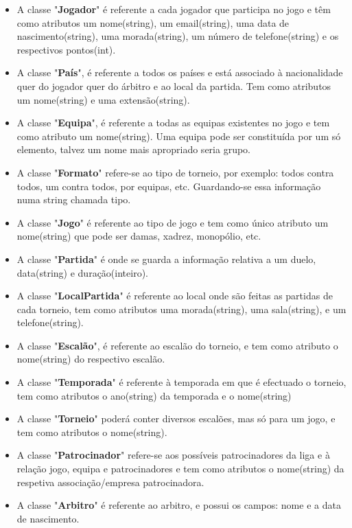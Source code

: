 \documentclass[a4paper]{article}
\begin{document}
\begin{itemize}

\item A classe "\textbf{Jogador}" é referente a cada jogador que participa no jogo e têm como atributos um nome(string), um email(string), uma data de nascimento(string), uma morada(string), um número de telefone(string) e  os respectivos pontos(int).

\item A classe "\textbf{País}", é referente a todos os países e está associado à nacionalidade quer do jogador quer do árbitro e ao local da partida. Tem como atributos um nome(string) e uma extensão(string).

\item A classe "\textbf{Equipa}", é referente a todas as equipas existentes no jogo e tem como atributo um nome(string). Uma equipa pode ser constituída por um só elemento, talvez um nome mais apropriado seria grupo.

\item A classe "\textbf{Formato}" refere-se ao tipo de torneio, por exemplo: todos contra todos, um contra todos, por equipas, etc. Guardando-se essa informação numa string chamada tipo.

\item A classe "\textbf{Jogo}" é referente ao tipo de jogo e tem como único atributo um nome(string) que pode ser damas, xadrez, monopólio, etc.

\item A classe "\textbf{Partida}" é onde se guarda a informação relativa a um duelo, data(string) e duração(inteiro).

\item A classe "\textbf{LocalPartida}" é referente ao local onde são feitas as partidas de cada torneio, tem como atributos uma morada(string), uma sala(string), e um telefone(string).

\item A classe "\textbf{Escalão}", é referente ao escalão do torneio, e tem como atributo o nome(string) do respectivo escalão.

\item A classe "\textbf{Temporada}" é referente à temporada em que é efectuado o torneio, tem como atributos o ano(string) da temporada e o nome(string)

\item A classe "\textbf{Torneio}" poderá conter diversos escalões, mas só para um jogo, e tem como atributos o nome(string).

\item A classe "\textbf{Patrocinador}" refere-se aos possíveis patrocinadores da liga e à relação jogo, equipa e patrocinadores e tem como atributos o nome(string) da respetiva associação/empresa patrocinadora.

\item A classe "\textbf{Arbitro}" é referente ao arbitro, e possui os campos: nome e a data de nascimento.
\end{itemize}
\end{document}

